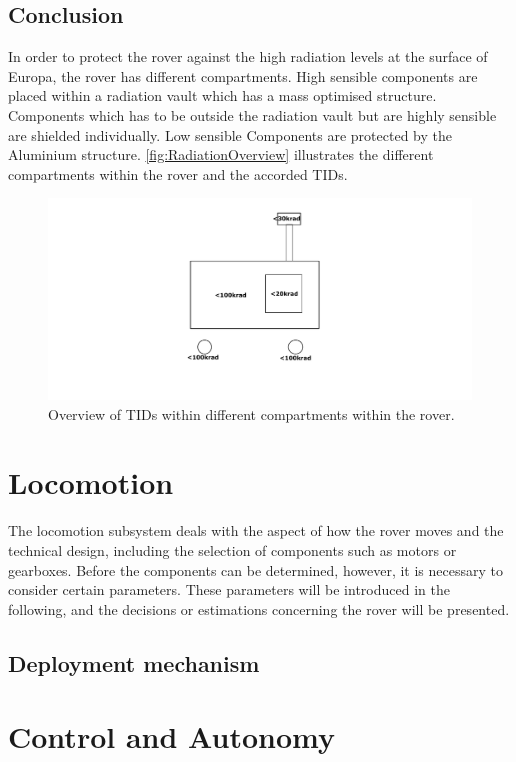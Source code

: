 \subsection{Conclusion}

\label{subsec:RadiationConclusion}

In order to protect the rover against the high radiation levels at the surface of Europa, the rover has different compartments. High sensible components are placed within a radiation vault which has a mass optimised structure. Components which has to be outside the radiation vault but are highly sensible are shielded individually. Low sensible Components are protected by the Aluminium structure. \autoref{fig:RadiationOverview} illustrates the different compartments within the rover and the accorded TIDs.

\begin{figure}[htb]
     \centering
     \includegraphics[width=\textwidth]{Media/RadiationOverview}
     \caption{Overview of TIDs within different compartments within the rover.}
     \label{fig:RadiationOverview}
\end{figure}

\clearpage

\section{Locomotion} \label{sec:locomotion}

The locomotion subsystem deals with the aspect of how the rover moves and the technical design, including the selection of components such as motors or gearboxes. Before the components can be determined, however, it is necessary to consider certain parameters. These parameters will be introduced in the following, and the decisions or estimations concerning the rover will be presented.












\subsection{Deployment mechanism}

\section{Control and Autonomy} \label{sec:ControlandAutonomy}

\cleardoublepage